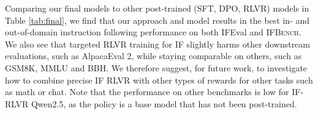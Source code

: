 \documentclass{article}
\newcommand{\benchname}{\textsc{IFBench}\xspace}
\begin{document}
Comparing our final models to other post-trained (SFT, DPO, RLVR) models in Table \ref{tab:final}, we find that our approach and model results in the best in- and out-of-domain instruction following performance on both IFEval and \benchname. We also see that targeted RLVR training for IF slightly harms other downstream evaluations, such as AlpacaEval 2, while staying comparable on others, such as GSM8K, MMLU and BBH. We therefore suggest, for future work, to investigate how to combine precise IF RLVR with other types of rewards for other tasks such as math or chat. Note that the performance on other benchmarks is low for IF-RLVR Qwen2.5, as the policy is a base model that has not been post-trained. 

\begin{table}[]
    \label{tab:fine_grained}


\end{table}
\end{document}
